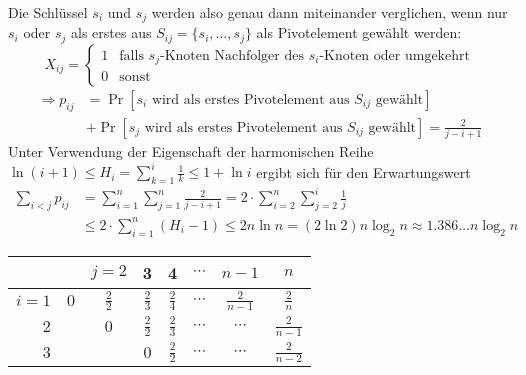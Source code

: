 Die Schlüssel $s_i$ und $s_j$ werden also genau dann miteinander verglichen,
wenn nur $s_i$ oder $s_j$ als erstes aus $S_{ij} = \{ s_i, \dots, s_j \}$ als
Pivotelement gewählt werden:
\[
  X_{ij} = \begin{cases} 1 & \text{falls $s_j$-Knoten Nachfolger des
  $s_i$-Knoten oder umgekehrt} \\ 0 & \text{sonst} \end{cases}
\]
\begin{align*}
  \Rightarrow p_{ij} &= \Pr\left[s_i \text{ wird als erstes Pivotelement aus $S_{ij}$ gewählt}\right] \\
  &+ \Pr\left[s_j \text{ wird als erstes Pivotelement aus $S_{ij}$ gewählt}\right] = \frac{2}{j-i+1}
\end{align*}
Unter Verwendung der Eigenschaft der harmonischen Reihe $\ln(i+1) \leq H_i =
\sum_{k=1}^i \frac{1}{k} \leq 1 + \ln i$ ergibt sich für den Erwartungswert
\begin{align*}
	\sum_{i<j} p_{ij} &= \sum_{i=1}^n \sum_{j=1}^n \frac{2}{j-i+1} = 2 \cdot \sum_{i=2}^n \sum_{j=2}^i \frac{1}{j} \\
			  &\leq 2 \cdot \sum_{i=1}^n \left(H_i - 1\right) \leq 2 n \ln n = (2 \ln 2) n \log_2 n \approx 1.386\dots n \log_2 n
\end{align*}
\renewcommand\arraystretch{1.5}
\begin{tabular}{r|ccccccc}
	& & $j = 2$ & 3 & 4 & $\cdots$ & $n-1$ & $n$ \\
	\hline
	$i = 1$ & $0$ & $\frac{2}{2}$ & $\frac{2}{3}$ & $\frac{2}{4}$ & $\cdots$ & $\frac{2}{n-1}$ & $\frac{2}{n}$ \\
	$2$ && $0$ & $\frac{2}{2}$ & $\frac{2}{3}$ & $\cdots$ & $\cdots$ & $\frac{2}{n-1}$ \\
	$3$ &&& $0$ & $\frac{2}{2}$ & $\cdots$ & $\cdots$ & $\frac{2}{n-2}$
\end{tabular}

\newpage

